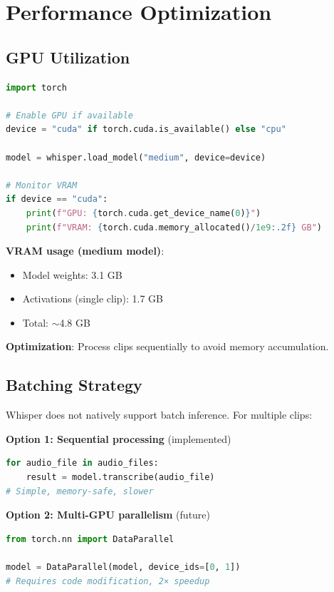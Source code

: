 \documentclass[11pt,a4paper]{article}
\begin{document}
\section{Performance Optimization}

\subsection{GPU Utilization}

\begin{lstlisting}[language=Python]
import torch

# Enable GPU if available
device = "cuda" if torch.cuda.is_available() else "cpu"

model = whisper.load_model("medium", device=device)

# Monitor VRAM
if device == "cuda":
    print(f"GPU: {torch.cuda.get_device_name(0)}")
    print(f"VRAM: {torch.cuda.memory_allocated()/1e9:.2f} GB")
\end{lstlisting}

\textbf{VRAM usage (medium model)}:
\begin{itemize}
    \item Model weights: 3.1 GB
    \item Activations (single clip): 1.7 GB
    \item Total: $\sim$4.8 GB
\end{itemize}

\textbf{Optimization}: Process clips sequentially to avoid memory accumulation.

\subsection{Batching Strategy}

Whisper does not natively support batch inference. For multiple clips:

\textbf{Option 1: Sequential processing} (implemented)
\begin{lstlisting}[language=Python]
for audio_file in audio_files:
    result = model.transcribe(audio_file)
# Simple, memory-safe, slower
\end{lstlisting}

\textbf{Option 2: Multi-GPU parallelism} (future)
\begin{lstlisting}[language=Python]
from torch.nn import DataParallel

model = DataParallel(model, device_ids=[0, 1])
# Requires code modification, 2× speedup
\end{lstlisting}
\end{document}
